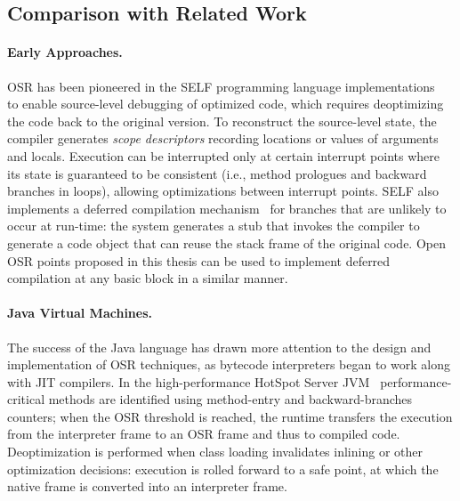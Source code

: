 

\subsection{Comparison with Related Work}
\label{ss:osr-llvm-related}

\paragraph*{Early Approaches.} OSR has been pioneered in the SELF programming language implementations~\cite{Holzle92} to enable source-level debugging of optimized code, which requires deoptimizing the code back to the original version. To reconstruct the source-level state, the compiler generates {\em scope descriptors} recording locations or values of arguments and locals. Execution can be interrupted only at certain interrupt points where its state is guaranteed to be consistent (i.e., method prologues and backward branches in loops), allowing optimizations between interrupt points. SELF also implements a deferred compilation mechanism~\cite{Chambers91} for branches that are unlikely to occur at run-time: the system generates a stub that invokes the compiler to generate a code object that can reuse the stack frame of the original code. Open OSR points proposed in this thesis can be used to implement deferred compilation at any basic block in a similar manner.

\paragraph*{Java Virtual Machines.} The success of the Java language has drawn more attention to the design and implementation of OSR techniques, as bytecode interpreters began to work along with JIT compilers. In the high-performance HotSpot Server JVM~\cite{Paleczny01} performance-critical methods are identified using method-entry and backward-branches counters; when the OSR threshold is reached, the runtime transfers the execution from the interpreter frame to an OSR frame and thus to compiled code. Deoptimization is performed when class loading invalidates inlining or other optimization decisions: execution is rolled forward to a safe point, at which the native frame is converted into an interpreter frame.


